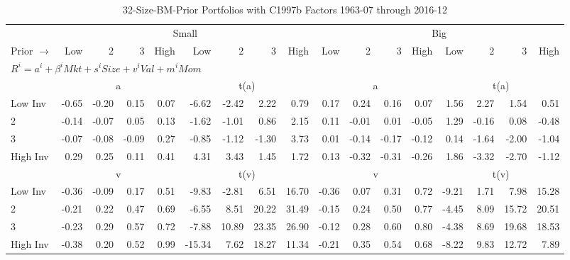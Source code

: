 
\begin{table}[!ht]
\centering
\caption{32-Size-BM-Prior Portfolios with C1997b Factors 1963-07 through 2016-12}
\begin{tabular}{lrrrrrrrrrrrrrrrr}
  \toprule
    & \multicolumn{8}{c}{Small} & \multicolumn{8}{c}{Big} \\
      \cmidrule(r){2-9} \cmidrule(r){10-17}
    Prior $\rightarrow$ & Low & 2 & 3 & High & Low & 2 & 3 & High & Low & 2 & 3 & High & Low & 2 & 3 & High \\ 
  \midrule
  \multicolumn{17}{l}{$R^i=a^i+\beta^iMkt+s^iSize+v^iVal+m^iMom$} \\

  
    
      & \multicolumn{4}{c}{a} & \multicolumn{4}{c}{t(a)}
    
      & \multicolumn{4}{c}{a} & \multicolumn{4}{c}{t(a)}
    
    \\
      \cmidrule(r){2-5} \cmidrule(r){6-9} \cmidrule(r){10-13} \cmidrule(r){14-17}

    Low Inv   & -0.65  & -0.20  & 0.15  & 0.07  & -6.62  & -2.42  & 2.22  & 0.79  & 0.17  & 0.24  & 0.16  & 0.07  & 1.56  & 2.27  & 1.54  & 0.51  \\
           2  & -0.14  & -0.07  & 0.05  & 0.13  & -1.62  & -1.01  & 0.86  & 2.15  & 0.11  & -0.01  & 0.01  & -0.05  & 1.29  & -0.16  & 0.08  & -0.48  \\
           3  & -0.07  & -0.08  & -0.09  & 0.27  & -0.85  & -1.12  & -1.30  & 3.73  & 0.01  & -0.14  & -0.17  & -0.12  & 0.14  & -1.64  & -2.00  & -1.04  \\
    High Inv  & 0.29  & 0.25  & 0.11  & 0.41  & 4.31  & 3.43  & 1.45  & 1.72  & 0.13  & -0.32  & -0.31  & -0.26  & 1.86  & -3.32  & -2.70  & -1.12  \\

  
    
      & \multicolumn{4}{c}{v} & \multicolumn{4}{c}{t(v)}
    
      & \multicolumn{4}{c}{v} & \multicolumn{4}{c}{t(v)}
    
    \\
      \cmidrule(r){2-5} \cmidrule(r){6-9} \cmidrule(r){10-13} \cmidrule(r){14-17}

    Low Inv   & -0.36  & -0.09  & 0.17  & 0.51  & -9.83  & -2.81  & 6.51  & 16.70  & -0.36  & 0.07  & 0.31  & 0.72  & -9.21  & 1.71  & 7.98  & 15.28  \\
           2  & -0.21  & 0.22  & 0.47  & 0.69  & -6.55  & 8.51  & 20.22  & 31.49  & -0.15  & 0.24  & 0.50  & 0.77  & -4.45  & 8.09  & 15.72  & 20.51  \\
           3  & -0.23  & 0.29  & 0.57  & 0.72  & -7.88  & 10.89  & 23.35  & 26.90  & -0.12  & 0.28  & 0.60  & 0.80  & -4.38  & 8.69  & 19.68  & 18.53  \\
    High Inv  & -0.38  & 0.20  & 0.52  & 0.99  & -15.34  & 7.62  & 18.27  & 11.34  & -0.21  & 0.35  & 0.54  & 0.68  & -8.22  & 9.83  & 12.72  & 7.89  \\


\end{tabular}
\end{table}
